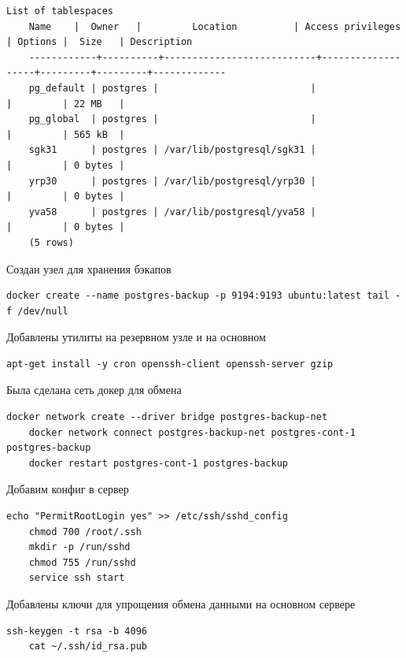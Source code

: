 \documentclass{article}
\begin{document}
\begin{lstlisting}[caption={kitty}, label={lst:example}]
    List of tablespaces
    Name    |  Owner   |         Location          | Access privileges | Options |  Size   | Description 
    ------------+----------+---------------------------+-------------------+---------+---------+-------------
    pg_default | postgres |                           |                   |         | 22 MB   | 
    pg_global  | postgres |                           |                   |         | 565 kB  | 
    sgk31      | postgres | /var/lib/postgresql/sgk31 |                   |         | 0 bytes | 
    yrp30      | postgres | /var/lib/postgresql/yrp30 |                   |         | 0 bytes | 
    yva58      | postgres | /var/lib/postgresql/yva58 |                   |         | 0 bytes | 
    (5 rows)
\end{lstlisting}


Создан узел для хранения бэкапов

\begin{lstlisting}[caption={kitty}, label={lst:example}]
    docker create --name postgres-backup -p 9194:9193 ubuntu:latest tail -f /dev/null
\end{lstlisting}

Добавлены утилиты на резервном узле и на основном
\begin{lstlisting}[caption={kitty}, label={lst:example}]
    apt-get install -y cron openssh-client openssh-server gzip
\end{lstlisting}

Была сделана сеть докер для обмена

\begin{lstlisting}[caption={kitty}, label={lst:example}]
    docker network create --driver bridge postgres-backup-net 
    docker network connect postgres-backup-net postgres-cont-1 postgres-backup
    docker restart postgres-cont-1 postgres-backup
\end{lstlisting}

Добавим конфиг в сервер 
\begin{lstlisting}[caption={kitty}, label={lst:example}]
    echo "PermitRootLogin yes" >> /etc/ssh/sshd_config
    chmod 700 /root/.ssh
    mkdir -p /run/sshd
    chmod 755 /run/sshd
    service ssh start
\end{lstlisting}

Добавлены ключи для упрощения обмена данными на основном сервере
\begin{lstlisting}[caption={kitty}, label={lst:example}]
    ssh-keygen -t rsa -b 4096
    cat ~/.ssh/id_rsa.pub 
\end{lstlisting}
\end{document}
